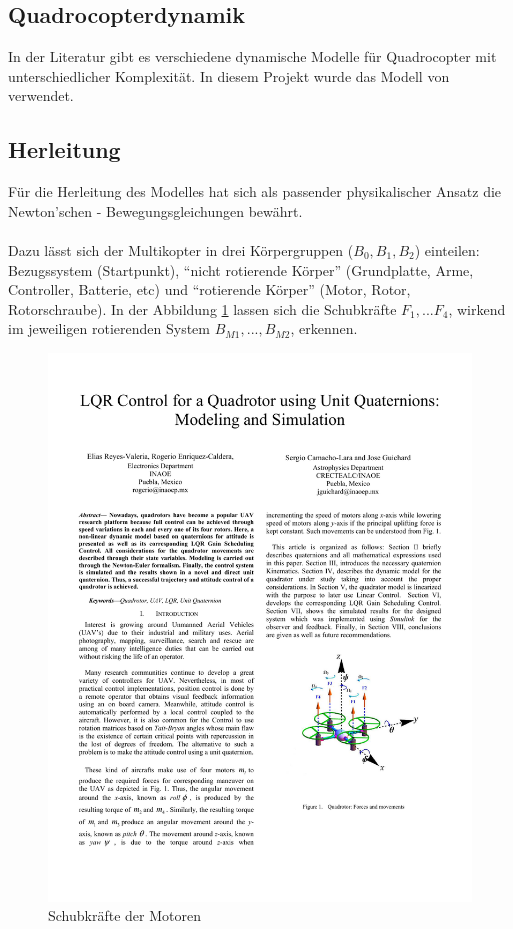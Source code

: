 \subsection{Quadrocopterdynamik}
In der Literatur gibt es verschiedene dynamische Modelle für Quadrocopter mit unterschiedlicher Komplexität. In diesem Projekt wurde das Modell von \cite{LQR2013} verwendet. 
\subsection{Herleitung}
Für die Herleitung des Modelles hat sich als passender physikalischer Ansatz die Newton'schen - Bewegungsgleichungen bewährt. \\\\

Dazu lässt sich der Multikopter in drei Körpergruppen ($B_0, B_1, B_2$) einteilen: Bezugssystem (Startpunkt), ``nicht rotierende Körper'' (Grundplatte, Arme, Controller, Batterie, etc) und ``rotierende Körper'' (Motor, Rotor, Rotorschraube). In der Abbildung \ref{fig:schubkraefte} lassen sich die Schubkräfte $F_1, ... F_4$, wirkend im jeweiligen rotierenden System $B_{M1}, ..., B_{M2}$, erkennen.
\begin{figure}[ht]
  \centering
  \includegraphics{images/MulticopterKraefte.pdf}
  \caption{Schubkräfte der Motoren}
  \label{fig:schubkraefte}
\end{figure} 

